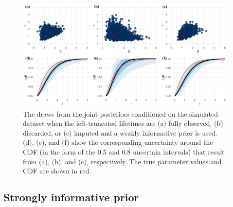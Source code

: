 \begin{figure}
    \centering
    \includegraphics[width=1\textwidth]{./figures/ch-2/joint-posts.pdf}
    \caption{The draws from the joint posteriors conditioned on the simulated dataset when the left-truncated lifetimes are (a) fully observed, (b) discarded, or (c) imputed and a weakly informative prior is used. (d), (e), and (f) show the corresponding uncertainty around the CDF (in the form of the 0.5 and 0.8 uncertain intervals) that result from (a), (b), and (c), respectively. The true parameter values and CDF are shown in red.}
    \label{fig:joint-post-weibull}
\end{figure}

\subsection{Strongly informative prior} \label{subsec:weibull-model-fits-informative}

